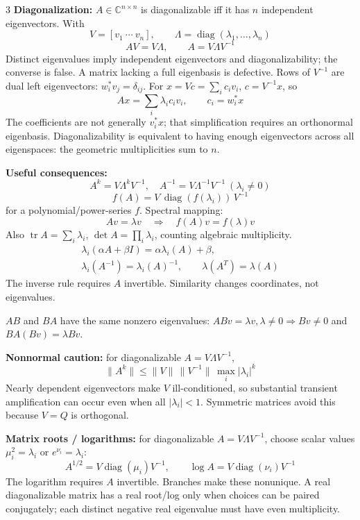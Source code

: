 \documentclass[10pt]{article}
\newcommand{\sub}[1]{\textbf{#1}}
\newcommand{\C}{\mathbb{C}}
\newcommand{\diag}{\operatorname{diag}}
\newcommand{\tr}{\operatorname{tr}}
\begin{document}
\begin{multicols*}{3}
\sub{Diagonalization:} \(A\in\C^{n\times n}\) is diagonalizable iff it has
\(n\) independent eigenvectors. With
\[
V=[v_1\ \cdots\ v_n],\qquad \Lambda=\diag(\lambda_1,\ldots,\lambda_n)
\]
\[
AV=V\Lambda,\qquad A=V\Lambda V^{-1}
\]
Distinct eigenvalues imply independent eigenvectors and diagonalizability;
the converse is false. A matrix lacking a full eigenbasis is defective.
Rows of \(V^{-1}\) are dual left eigenvectors:
\(w_i^*v_j=\delta_{ij}\).
For \(x=Vc=\sum_i c_iv_i\), \(c=V^{-1}x\), so
\[
Ax=\sum_i\lambda_i c_iv_i,\qquad c_i=w_i^*x
\]
The coefficients are not generally \(v_i^*x\); that simplification
requires an orthonormal eigenbasis.
Diagonalizability is equivalent to having enough eigenvectors across all
eigenspaces: the geometric multiplicities sum to \(n\).

\sub{Useful consequences:}
\[
A^k=V\Lambda^kV^{-1},\quad
A^{-1}=V\Lambda^{-1}V^{-1}\ (\lambda_i\ne0)
\]
\[
f(A)=V\,\diag(f(\lambda_i))\,V^{-1}
\]
for a polynomial/power-series \(f\). Spectral mapping:
\[
Av=\lambda v\quad\Rightarrow\quad f(A)v=f(\lambda)v
\]
Also \(\tr A=\sum_i\lambda_i\), \(\det A=\prod_i\lambda_i\), counting
algebraic multiplicity.
\[
\begin{gathered}
\lambda_i(\alpha A+\beta I)=\alpha\lambda_i(A)+\beta,\\
\lambda_i(A^{-1})=\lambda_i(A)^{-1},\qquad
\lambda(A^T)=\lambda(A)
\end{gathered}
\]
The inverse rule requires \(A\) invertible. Similarity changes
coordinates, not eigenvalues.

\(AB\) and \(BA\) have the same nonzero eigenvalues:
\(ABv=\lambda v,\lambda\ne0\Rightarrow Bv\ne0\) and
\(BA(Bv)=\lambda Bv\).

\sub{Nonnormal caution:} for diagonalizable \(A=V\Lambda V^{-1}\),
\[
\|A^k\|\le\|V\|\,\|V^{-1}\|\,\max_i|\lambda_i|^k
\]
Nearly dependent eigenvectors make \(V\) ill-conditioned, so substantial
transient amplification can occur even when all \(|\lambda_i|<1\).
Symmetric matrices avoid this because \(V=Q\) is orthogonal.

\sub{Matrix roots / logarithms:} for diagonalizable
\(A=V\Lambda V^{-1}\), choose scalar values \(\mu_i^2=\lambda_i\) or
\(e^{\nu_i}=\lambda_i\):
\[
A^{1/2}=V\diag(\mu_i)V^{-1},\qquad
\log A=V\diag(\nu_i)V^{-1}
\]
The logarithm requires \(A\) invertible. Branches make these nonunique.
A real diagonalizable matrix has a real
root/log only when choices can be paired conjugately; each distinct
negative real eigenvalue must have even multiplicity.


\end{multicols*}
\end{document}
